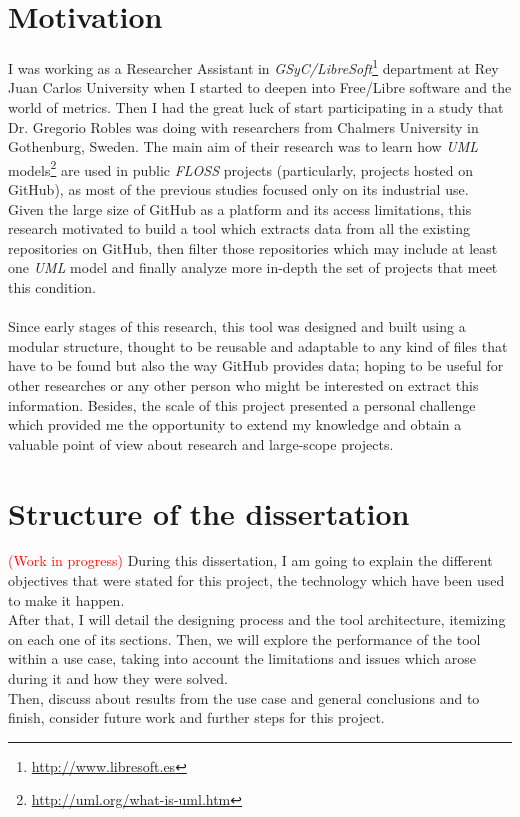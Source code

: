 \documentclass[a4paper, 12pt]{book}
\begin{document}
\section{Motivation}
\label{sec:motivation}
I was working as a Researcher Assistant in \emph{GSyC/LibreSoft}\footnote{\url{http://www.libresoft.es}} department at Rey Juan Carlos University when I started to
deepen into Free/Libre software and the world of metrics. Then I had the great luck of start participating in a study that
Dr. Gregorio Robles was doing with researchers from Chalmers University in Gothenburg, Sweden. The main aim of their research was to
learn how \emph{UML} models\footnote{\url{http://uml.org/what-is-uml.htm}} are used in public \emph{FLOSS} projects (particularly, projects hosted on GitHub),
as most of the previous studies focused only on its industrial use.\\
Given the large size of GitHub as a platform and its access limitations, this research motivated to build a tool which extracts
data from all the existing repositories on GitHub, then filter those repositories which may include at least one
\emph{UML} model and finally analyze more in-depth the set of projects that meet this condition.\\\\
Since early stages of this research, this tool was designed and built using a modular structure, thought to be reusable
and adaptable to any kind of files that have to be found but also the way GitHub provides data; hoping to be useful
for other researches or any other person who might be interested on extract this information. Besides, the scale of this project
presented a personal challenge which provided me the opportunity to extend my knowledge and obtain a valuable point of
view about research and large-scope projects.
\section{Structure of the dissertation}
\label{sec:estructura}
\textcolor{red}{(Work in progress)}\newline
During this dissertation, I am going to explain the different objectives that were stated for this project, the technology
which have been used to make it happen.\\
After that, I will detail the designing process and the tool architecture, itemizing on each one of its sections. Then,
we will explore the performance of the tool within a use case, taking into account the limitations and issues which arose
during it and how they were solved.\\Then, discuss about results from the use case and general conclusions
and to finish, consider future work and further steps for this project.
\cleardoublepage
\end{document}

